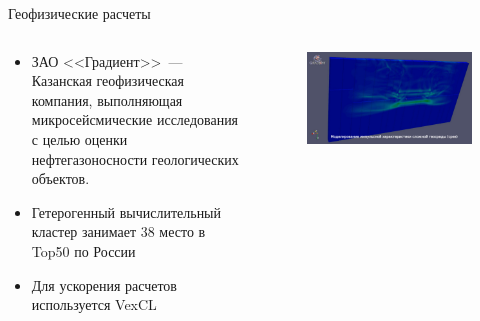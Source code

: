 \documentclass[@BEAMER_OPTIONS@]{beamer}
\begin{document}
\begin{frame}{Геофизические расчеты}
    \begin{columns}
        \begin{column}{0.45\textwidth}
            \begin{itemize}
                \item ЗАО <<Градиент>>~--- Казанская геофизическая компания,
                    выполняющая микросейсмические исследования с целью оценки
                    нефтегазоносности геологических объектов.
                \item Гетерогенный вычислительный кластер занимает 38 место в
                    Top50 по России
                \item Для ускорения расчетов используется VexCL
            \end{itemize}
        \end{column}
        \begin{column}{0.55\textwidth}
            \begin{figure}
                \includegraphics[width=\textwidth]{microseism}
            \end{figure}
        \end{column}
    \end{columns}
\end{frame}
\end{document}
